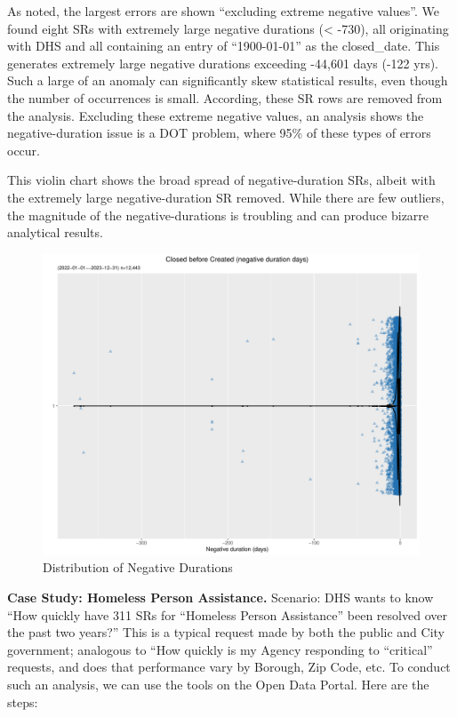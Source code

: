 \documentclass[12pt, titlepage]{article}
\begin{document}
	
As noted, the largest errors are shown ``excluding extreme negative values''. We found 
eight SRs with extremely large negative durations (\textless{} -730), all originating
with DHS and all containing an entry of ``1900-01-01'' as the closed\_date. This 
generates extremely large negative durations exceeding -44,601 
days (-122 yrs). Such a large of an anomaly can significantly skew statistical 
results, even though the number of occurrences is small. According, these 
SR rows are removed from the analysis. Excluding these extreme negative
values, an analysis shows the negative-duration issue is a DOT problem, 
where 95\% of these types of errors occur. 
	
	
This violin chart shows the broad spread of negative-duration SRs, albeit with 
the extremely large negative-duration SR removed. While there are few 
outliers, the magnitude of the negative-durations is troubling and can 
produce bizarre analytical results.


\begin{figure}[tbp]
	 \centering
	 \includegraphics[width = \textwidth]{negative_duration_SR_violin.pdf}
 \caption{Distribution of Negative Durations}
 \label{fig:negative-duration-violin}
\end{figure}


\label{sec:homlessassistance}
\textbf{Case Study: Homeless Person Assistance.} Scenario: DHS wants to know ``How 
quickly have 311 SRs for ``Homeless Person Assistance'' been resolved 
over the past two years?'' This is a typical request made by 
both the public and City government; analogous to ``How quickly 
is my Agency responding to ``critical'' requests, and does 
that performance vary by Borough, Zip Code, etc. To conduct such an 
analysis, we can use the tools on the Open Data Portal. Here are the steps:
		
\end{document}
